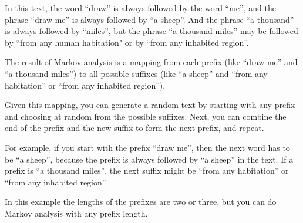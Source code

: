%
In this text,
the word ``draw'' is always followed by the word ``me'', and 
the phrase ``draw me'' is always followed by ``a sheep''. And the 
phrase ``a thousand'' is always followed by ``miles'', but the 
phrase ``a thousand miles'' may be followed by ``from any 
human habitation" or by ``from any inhabited region''.

The result of Markov analysis is a mapping from each prefix
(like ``draw me'' and ``a thousand miles'') to all possible 
suffixes
(like ``a sheep'' and ``from any habitation'' or ``from any inhabited region'').

Given this mapping, you can generate a random text by
starting with any prefix and choosing at random from the
possible suffixes.  Next, you can combine the end of the
prefix and the new suffix to form the next prefix, and repeat.

For example, if you start with the prefix ``draw me'', then the
next word has to be ``a sheep'', because the prefix is always 
followed by ``a sheep'' in the text.  If a prefix is ``a thousand 
miles'', the next suffix might be ``from any habitation'' or ``from any inhabited region''.

In this example the lengths of the prefixes are two or three, but
you can do Markov analysis with any prefix length.

